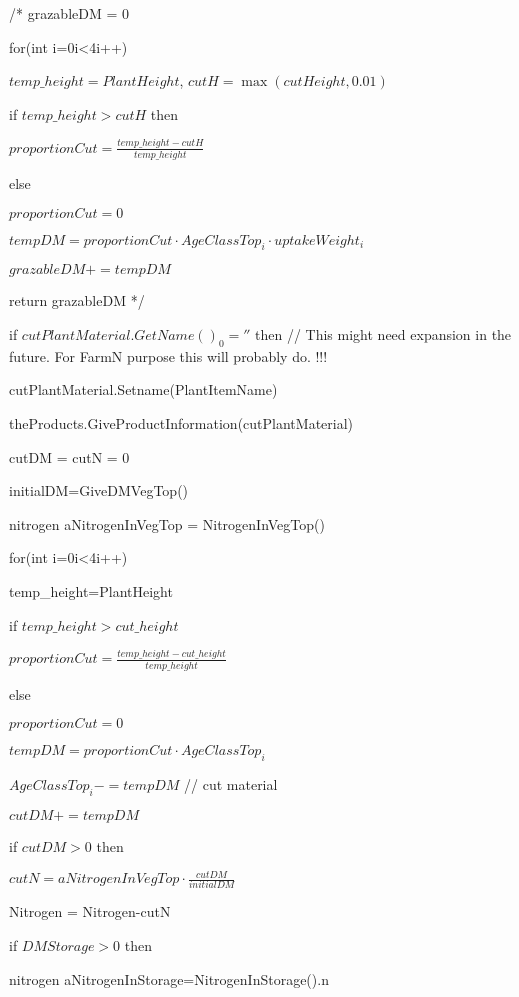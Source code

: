 \documentclass[%
]{scrartcl}
\begin{document}
/* 
   \quad  grazableDM = 0

   for(int i=0i<4i++)

    \quad    $temp\_height=PlantHeight$,
       $cutH=\max(cutHeight,0.01)$

     \quad   if $temp\_height>cutH$ then

    \quad  \quad     	$proportionCut= \tfrac{temp\_height - cutH}{temp\_height}$

    \quad    else

   \quad  \quad     	$proportionCut = 0$

    \quad    $tempDM=proportionCut  \cdot  AgeClassTop_i  \cdot  uptakeWeight_i$

 \quad 	  $ grazableDM +=tempDM$
  
   return grazableDM
*/


   if $cutPlantMaterial.GetName()_0 = ''$ then //  
This might need expansion in the future. For FarmN purpose this will probably do. !!!
   
\quad      cutPlantMaterial.Setname(PlantItemName)

\quad       theProducts.GiveProductInformation(cutPlantMaterial)
   
 cutDM = 
   cutN = 0

   initialDM=GiveDMVegTop()

   nitrogen  aNitrogenInVegTop = NitrogenInVegTop()

   for(int i=0i<4i++)
   
\quad       temp\_height=PlantHeight

\quad       if $temp\_height>cut\_height$

\quad \quad       	$proportionCut = \tfrac{temp\_height-cut\_height}{temp\_height}$

\quad       else

\quad \quad       	$proportionCut = 0$

\quad       $tempDM = proportionCut \cdot AgeClassTop_i$

\quad       $AgeClassTop_i-= tempDM $  // cut material

\quad 	   $cutDM += tempDM$

   if $cutDM>0$ then
  	
\quad       $cutN = aNitrogenInVegTop \cdot \tfrac{cutDM}{initialDM}$

 \quad      Nitrogen = Nitrogen-cutN
 
   if $DMStorage > 0$ then

\quad    	nitrogen aNitrogenInStorage=NitrogenInStorage().n
\end{document}
